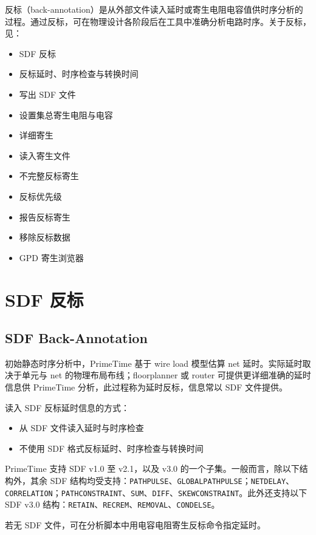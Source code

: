 \label{chap:backann}

反标（back-annotation）是从外部文件读入延时或寄生电阻电容值供时序分析的过程。通过反标，可在物理设计各阶段后在工具中准确分析电路时序。关于反标，见：
\begin{itemize}
  \item SDF 反标
  \item 反标延时、时序检查与转换时间
  \item 写出 SDF 文件
  \item 设置集总寄生电阻与电容
  \item 详细寄生
  \item 读入寄生文件
  \item 不完整反标寄生
  \item 反标优先级
  \item 报告反标寄生
  \item 移除反标数据
  \item GPD 寄生浏览器
\end{itemize}

\section{SDF 反标}
\subsection*{SDF Back-Annotation}

初始静态时序分析中，PrimeTime 基于 wire load 模型估算 net 延时。实际延时取决于单元与 net 的物理布局布线；floorplanner 或 router 可提供更详细准确的延时信息供 PrimeTime 分析，此过程称为延时反标，信息常以 SDF 文件提供。

读入 SDF 反标延时信息的方式：
\begin{itemize}
  \item 从 SDF 文件读入延时与时序检查
  \item 不使用 SDF 格式反标延时、时序检查与转换时间
\end{itemize}

PrimeTime 支持 SDF v1.0 至 v2.1，以及 v3.0 的一个子集。一般而言，除以下结构外，其余 SDF 结构均受支持：\texttt{PATHPULSE}、\texttt{GLOBALPATHPULSE}；\texttt{NETDELAY}、\texttt{CORRELATION}；\texttt{PATHCONSTRAINT}、\texttt{SUM}、\texttt{DIFF}、\texttt{SKEWCONSTRAINT}。此外还支持以下 SDF v3.0 结构：\texttt{RETAIN}、\texttt{RECREM}、\texttt{REMOVAL}、\texttt{CONDELSE}。

若无 SDF 文件，可在分析脚本中用电容电阻寄生反标命令指定延时。

